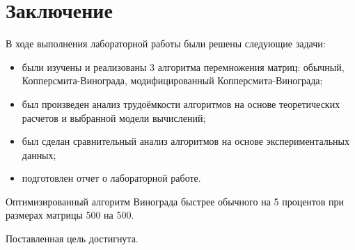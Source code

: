 \chapter*{Заключение}

В ходе выполнения лабораторной работы были решены следующие задачи:

\begin{itemize}
	\item были изучены и реализованы 3 алгоритма перемножения матриц: обычный, Копперсмита-Винограда, модифицированный Копперсмита-Винограда;
	
	\item был произведен анализ трудоёмкости алгоритмов на основе теоретических расчетов и выбранной модели вычислений;
	\item был сделан сравнительный анализ алгоритмов на основе экспериментальных данных;
	
	\item подготовлен отчет о лабораторной работе.
\end{itemize}

Оптимизированный алгоритм Винограда быстрее обычного на 5 процентов при размерах матрицы 500 на 500.

Поставленная цель достигнута.